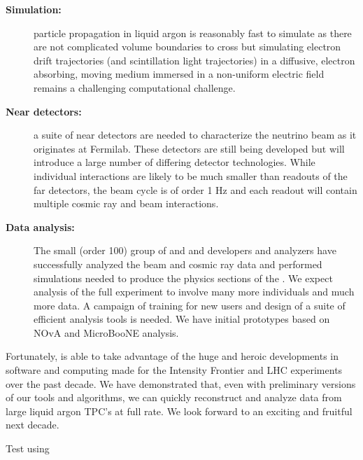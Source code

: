 \begin{description}
\item[{\bf Simulation:}] particle propagation in liquid argon is reasonably fast to simulate as there are not complicated volume boundaries to cross but simulating electron drift trajectories (and scintillation light trajectories) in a diffusive, electron absorbing, moving medium immersed in a non-uniform  electric field remains a challenging computational challenge. 
\item[{\bf Near detectors:}] a suite of near detectors are needed to characterize the neutrino beam as it originates at Fermilab.  These detectors are still being developed but will introduce a large number of differing detector technologies.  While individual interactions are likely to be much smaller than readouts of the far detectors, the beam cycle is of order 1 Hz and each readout will contain multiple cosmic ray and beam interactions.
\item[{\bf Data analysis:} ] The small (order 100) group of  and  and  developers and analyzers have successfully analyzed the beam and cosmic ray data and performed simulations needed to produce the physics sections of the .  We expect analysis of the full experiment to involve many more individuals and much more data.  A campaign of training for new users and design of a suite of efficient analysis tools is needed.  We have initial prototypes based on NOvA and MicroBooNE analysis. 
\end{description}

Fortunately,  is able to take advantage of the huge and heroic developments in software and computing made for the Intensity Frontier and LHC experiments over the past decade.  We have demonstrated that, even with preliminary versions of our tools and algorithms, we can quickly reconstruct and analyze data from large liquid argon TPC's at full rate. We look forward to an exciting and fruitful next decade. 



Test using 